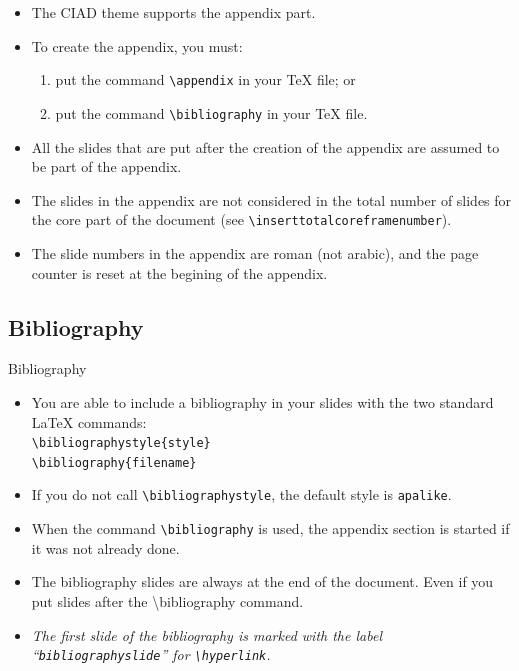 \documentclass[english,sectioncirclenumberstyle]{ciadbeamer}
\begin{document}
\begin{frame}{\subsecname}
	\begin{itemize}
	\item The CIAD theme supports the appendix part.
	\vspace{1em}
	\item To create the appendix, you must:
		\begin{enumerate}
		\item put the command \texttt{{\textbackslash}appendix} in your {\TeX} file; or
		\item put the command \texttt{{\textbackslash}bibliography} in your {\TeX} file.
		\end{enumerate}
	\vspace{1em}
	\item All the slides that are put after the creation of the appendix are assumed to be part of the appendix.
	\item The slides in the appendix are not considered in the total number of slides for the core part of the document (see \texttt{{\textbackslash}inserttotalcoreframenumber}).
	\item The slide numbers in the appendix are roman (not arabic), and the page counter is reset at the begining of the appendix.
	\end{itemize}
\end{frame}

\subsection{Bibliography}

\begin{frame}{Bibliography}
	\begin{itemize}
	\item You are able to include a bibliography in your slides with the two standard {\LaTeX} commands: \\
		\texttt{{\textbackslash}bibliographystyle\{style\}} \\
		\texttt{{\textbackslash}bibliography\{filename\}}
	\vspace{1em}
	\item If you do not call \texttt{{\textbackslash}bibliographystyle}, the default style is \texttt{apalike}.
	\vspace{1em}
	\item When the command \texttt{{\textbackslash}bibliography} is used, the appendix section is started if it was not already done.
	\item The bibliography slides are \alert{always at the end of the document}. Even if you put slides after the {\textbackslash}bibliography command.
	\item \emph{The first slide of the bibliography is marked with the label ``\texttt{bibliographyslide}'' for \texttt{{\textbackslash}hyperlink}.}
	\end{itemize}
\end{frame}
\end{document}
